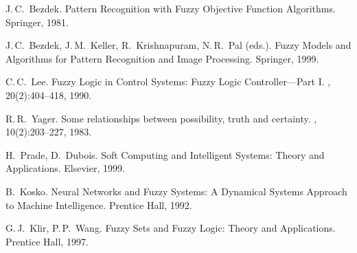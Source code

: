 \begin{thebibliography}{200}
J.\,C.~Bezdek.
\newblock Pattern Recognition with Fuzzy Objective Function Algorithms.
\newblock Springer, 1981.

J.\,C.~Bezdek, J.\,M.~Keller, R.~Krishnapuram, N.\,R.~Pal (eds.).
\newblock Fuzzy Models and Algorithms for Pattern Recognition and Image Processing.
\newblock Springer, 1999.

C.\,C.~Lee.
\newblock Fuzzy Logic in Control Systems: Fuzzy Logic Controller—Part I.
, 20(2):404–418, 1990.

R.\,R.~Yager.
\newblock Some relationships between possibility, truth and certainty.
, 10(2):203–227, 1983.

H.~Prade, D.~Dubois.
\newblock Soft Computing and Intelligent Systems: Theory and Applications.
\newblock Elsevier, 1999.

B.~Kosko.
\newblock Neural Networks and Fuzzy Systems: A Dynamical Systems Approach to Machine Intelligence.
\newblock Prentice Hall, 1992.

G.\,J.~Klir, P.\,P.~Wang.
\newblock Fuzzy Sets and Fuzzy Logic: Theory and Applications.
\newblock Prentice Hall, 1997.

\end{thebibliography}
